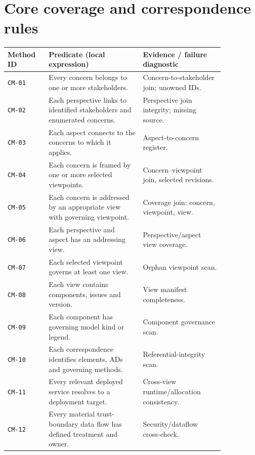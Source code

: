 \documentclass[11pt,letterpaper]{article}
\begin{document}
\section{Core coverage and correspondence rules}
\begin{longtable}{p{0.16\linewidth}p{0.37\linewidth}p{0.32\linewidth}}\toprule\textbf{Method ID}&\textbf{Predicate (local expression)}&\textbf{Evidence / failure diagnostic}\\\midrule\endhead
\texttt{CM-01}&Every concern belongs to one or more stakeholders.&Concern-to-stakeholder join; unowned IDs.\\
\texttt{CM-02}&Each perspective links to identified stakeholders and enumerated concerns.&Perspective join integrity; missing source.\\
\texttt{CM-03}&Each aspect connects to the concerns to which it applies.&Aspect-to-concern register.\\
\texttt{CM-04}&Each concern is framed by one or more selected viewpoints.&Concern--viewpoint join, selected revisions.\\
\texttt{CM-05}&Each concern is addressed by an appropriate view with governing viewpoint.&Coverage join: concern, viewpoint, view.\\
\texttt{CM-06}&Each perspective and aspect has an addressing view.&Perspective/aspect view coverage.\\
\texttt{CM-07}&Each selected viewpoint governs at least one view.&Orphan viewpoint scan.\\
\texttt{CM-08}&Each view contains components, issues and version.&View manifest completeness.\\
\texttt{CM-09}&Each component has governing model kind or legend.&Component governance scan.\\
\texttt{CM-10}&Each correspondence identifies elements, ADs and governing methods.&Referential-integrity scan.\\
\texttt{CM-11}&Every relevant deployed service resolves to a deployment target.&Cross-view runtime/allocation consistency.\\
\texttt{CM-12}&Every material trust-boundary data flow has defined treatment and owner.&Security/dataflow cross-check.\\\bottomrule\end{longtable}
\end{document}
